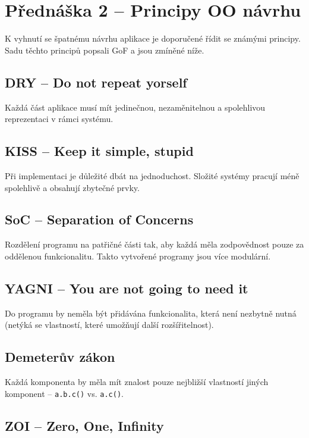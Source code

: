 \section{Přednáška 2 -- Principy OO návrhu}

K vyhnutí se špatnému návrhu aplikace je doporučené řídit se známými principy.
Sadu těchto principů popsali GoF a jsou zmíněné níže.

\subsection{DRY -- Do not repeat yorself}

Každá část aplikace musí mít jedinečnou, nezaměnitelnou a spolehlivou reprezentaci v rámci systému.

\subsection{KISS -- Keep it simple, stupid}

Při implementaci je důležité dbát na jednoduchost.
Složité systémy pracují méně spolehlivě a obsahují zbytečné prvky.

\subsection{SoC -- Separation of Concerns}

Rozdělení programu na patřičné části tak, aby každá měla zodpovědnost pouze za oddělenou funkcionalitu.
Takto vytvořené programy jsou více modulární.

\subsection{YAGNI -- You are not going to need it}

Do programu by neměla být přidávána funkcionalita, která není nezbytně nutná (netýká se vlastností, které umožňují další rozšířitelnost).

\subsection{Demeterův zákon}

Každá komponenta by měla mít znalost pouze nejbližší vlastností jiných komponent -- \texttt{a.b.c()} vs. \texttt{a.c()}.

\subsection{ZOI -- Zero, One, Infinity}

